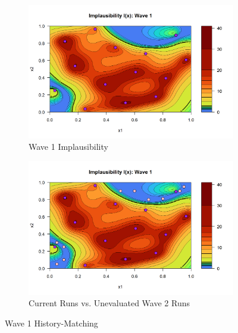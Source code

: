 \documentclass[12pt]{report} %
\begin{document}
\begin{figure}[H]
    \begin{subfigure}[b]{0.49\textwidth}
        \centering
        \includegraphics[width=\textwidth]{Wave 1 Implausibility.png}
        \caption{Wave 1 Implausibility}
        \label{fig:Wave 1 Implausibility}
    \end{subfigure}
    \hfill
    \begin{subfigure}[b]{0.49\textwidth}
        \centering
        \includegraphics[width=\textwidth]{Current Runs vs. Unevaluated Wave 2 Runs.png}
        \captionsetup{font=footnotesize} 
        \caption{Current Runs vs. Unevaluated Wave 2 Runs}
        \label{fig:Current Runs vs. Unevaluated Wave 2 Runs}
    \end{subfigure}

    \caption{Wave 1 History-Matching}
    \label{fig:Wave 1 History-Matching}
\end{figure}
\end{document}
